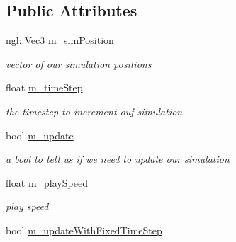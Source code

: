 \subsection*{Public Attributes}
\begin{DoxyCompactItemize}
\item 
\hypertarget{struct_open_g_l_widget_1_1fluid_sim_props_a082f58c5f4d8da41730696d9c8d9f805}{ngl\-::\-Vec3 \hyperlink{struct_open_g_l_widget_1_1fluid_sim_props_a082f58c5f4d8da41730696d9c8d9f805}{m\-\_\-sim\-Position}}\label{struct_open_g_l_widget_1_1fluid_sim_props_a082f58c5f4d8da41730696d9c8d9f805}

\begin{DoxyCompactList}\small\item\em vector of our simulation positions \end{DoxyCompactList}\item 
\hypertarget{struct_open_g_l_widget_1_1fluid_sim_props_a393e95277858fe2f1a15ed8dced0cfa8}{float \hyperlink{struct_open_g_l_widget_1_1fluid_sim_props_a393e95277858fe2f1a15ed8dced0cfa8}{m\-\_\-time\-Step}}\label{struct_open_g_l_widget_1_1fluid_sim_props_a393e95277858fe2f1a15ed8dced0cfa8}

\begin{DoxyCompactList}\small\item\em the timestep to increment ouf simulation \end{DoxyCompactList}\item 
\hypertarget{struct_open_g_l_widget_1_1fluid_sim_props_a61d7eb937176e81210ea734d259a76d1}{bool \hyperlink{struct_open_g_l_widget_1_1fluid_sim_props_a61d7eb937176e81210ea734d259a76d1}{m\-\_\-update}}\label{struct_open_g_l_widget_1_1fluid_sim_props_a61d7eb937176e81210ea734d259a76d1}

\begin{DoxyCompactList}\small\item\em a bool to tell us if we need to update our simulation \end{DoxyCompactList}\item 
\hypertarget{struct_open_g_l_widget_1_1fluid_sim_props_aed3387c3ad2d0e2870b8c0dccbb997c9}{float \hyperlink{struct_open_g_l_widget_1_1fluid_sim_props_aed3387c3ad2d0e2870b8c0dccbb997c9}{m\-\_\-play\-Speed}}\label{struct_open_g_l_widget_1_1fluid_sim_props_aed3387c3ad2d0e2870b8c0dccbb997c9}

\begin{DoxyCompactList}\small\item\em play speed \end{DoxyCompactList}\item 
\hypertarget{struct_open_g_l_widget_1_1fluid_sim_props_ac0da57cf2f1dbf63397abe674fa7c558}{bool \hyperlink{struct_open_g_l_widget_1_1fluid_sim_props_ac0da57cf2f1dbf63397abe674fa7c558}{m\-\_\-update\-With\-Fixed\-Time\-Step}}\label{struct_open_g_l_widget_1_1fluid_sim_props_ac0da57cf2f1dbf63397abe674fa7c558}


\end{DoxyCompactItemize}
